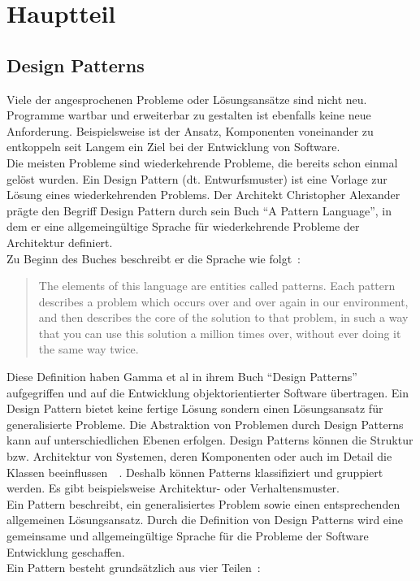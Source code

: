 \chapter{Hauptteil}

\section{Design Patterns}
Viele der angesprochenen Probleme oder Lösungsansätze sind nicht neu. Programme wartbar und erweiterbar zu gestalten ist ebenfalls keine neue Anforderung. Beispielsweise ist der Ansatz, Komponenten voneinander zu entkoppeln seit Langem ein Ziel bei der Entwicklung von Software.\\
Die meisten Probleme sind wiederkehrende Probleme, die bereits schon einmal gelöst wurden. Ein Design Pattern (dt. Entwurfsmuster) ist eine Vorlage zur Lösung eines wiederkehrenden Problems. Der Architekt Christopher Alexander prägte den Begriff Design Pattern durch sein Buch \enquote{A Pattern Language}, in dem er eine allgemeingültige Sprache für wiederkehrende Probleme der Architektur definiert.\\
Zu Beginn des Buches beschreibt er die Sprache wie folgt~\cite[S. \textit{x}]{alexander_pattern_1977}:

\begin{quotation}
The elements of this language are entities called patterns. Each pattern describes a problem which occurs over and over again in our environment, and then describes the core of the solution to that problem, in such a way that you can use this solution a million times over, without ever doing it the same way twice.
\end{quotation}

Diese Definition haben Gamma et al in ihrem Buch \enquote{Design Patterns} aufgegriffen und auf die Entwicklung objektorientierter Software übertragen. Ein Design Pattern bietet keine fertige Lösung sondern einen Lösungsansatz für generalisierte Probleme. Die Abstraktion von Problemen durch Design Patterns kann auf unterschiedlichen Ebenen erfolgen. Design Patterns können die Struktur bzw. Architektur von Systemen, deren Komponenten oder auch im Detail die Klassen beeinflussen~\cite[S.~3]{gamma_design_1995}~\cite[S.~127]{douglass_real-time_2003}. Deshalb können Patterns klassifiziert und gruppiert werden. Es gibt beispielsweise Architektur- oder Verhaltensmuster.\\
Ein Pattern beschreibt, ein generalisiertes Problem sowie einen entsprechenden allgemeinen Lösungsansatz. Durch die Definition von Design Patterns wird eine gemeinsame und allgemeingültige Sprache für die Probleme der Software Entwicklung geschaffen.\\
Ein Pattern besteht grundsätzlich aus vier Teilen~\cite[S.~3]{gamma_design_1995}:

